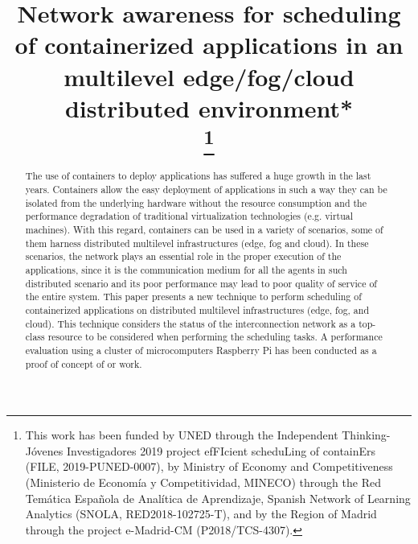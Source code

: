 \documentclass[conference]{IEEEtran}
\begin{document}
\title{Network awareness for  scheduling of containerized applications in an multilevel edge/fog/cloud distributed environment*\\
\thanks{This work has been funded by UNED through the Independent Thinking-J\'ovenes Investigadores 2019 project efFIcient scheduLing of containErs (FILE, 2019-PUNED-0007), by Ministry of Economy and Competitiveness (Ministerio de Econom\'ia y Competitividad, MINECO) through the Red Tem\'atica Espa\~nola de Anal\'itica de Aprendizaje, Spanish Network of Learning Analytics (SNOLA, RED2018-102725-T), and by the Region of Madrid through the project e-Madrid-CM (P2018/TCS-4307).
}
}

\author{
}


\maketitle

\begin{abstract}


The use of containers to deploy applications has suffered a huge growth in the last years. Containers allow the easy deployment of applications in such a way they can be isolated from the underlying hardware without the resource consumption and the performance degradation of traditional virtualization technologies (e.g. virtual machines). With this regard, containers can be used in a variety of scenarios, some of them harness distributed multilevel infrastructures (edge, fog and cloud). In these scenarios, the network plays an essential role in the proper execution of the applications, since it is the communication medium for all the agents in such distributed scenario and its poor performance may lead to poor quality of service of the entire system. This paper presents a new technique to perform scheduling of containerized applications on distributed multilevel infrastructures  (edge, fog, and cloud). This technique considers the status of the interconnection network as a top-class resource to be considered when performing the scheduling tasks. A performance evaluation using a cluster of microcomputers Raspberry  Pi has been conducted as a proof of concept of or work.



\end{abstract}
\end{document}
